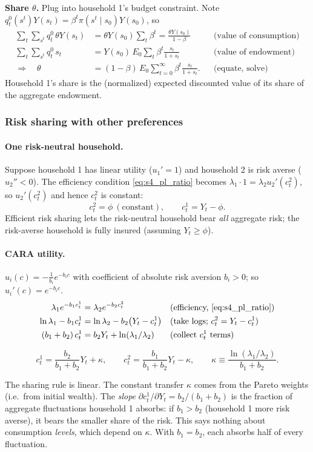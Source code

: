 \textbf{Share $\theta$.} Plug into household 1's budget constraint. Note $q^0_t(s^t)Y(s_t)=\beta^t\pi(s^t\mid s_0)Y(s_0)$, so
\begin{align*}
  \sum_t\sum_{s^t}q^0_t\,\theta Y(s_t) &= \theta Y(s_0)\sum_t\beta^t = \frac{\theta Y(s_0)}{1-\beta}
  && \text{(value of consumption)}\\
  \sum_t\sum_{s^t}q^0_t\, s_t &= Y(s_0)\,E_0\sum_t\beta^t\frac{s_t}{1+s_t}
  && \text{(value of endowment)}\\
  \Rightarrow\quad \theta &= (1-\beta)\,E_0\sum_{t=0}^\infty\beta^t\frac{s_t}{1+s_t}. && \text{(equate, solve)}
\end{align*}
Household 1's share is the (normalized) expected discounted value of its share of the aggregate endowment.

\subsubsection{Risk sharing with other preferences}
\paragraph{One risk-neutral household.} Suppose household 1 has linear utility ($u_1'=1$) and household 2 is risk averse ($u_2''<0$). The efficiency condition \eqref{eq:s4_pl_ratio} becomes $\lambda_1\cdot1=\lambda_2u_2'(c^2_t)$, so $u_2'(c^2_t)$ and hence $c^2_t$ is constant:
\[
  c^2_t=\phi\ (\text{constant}),\qquad c^1_t=Y_t-\phi .
\]
Efficient risk sharing lets the risk-neutral household bear \emph{all} aggregate risk; the risk-averse household is fully insured (assuming $Y_t\ge\phi$).

\paragraph{CARA utility.} $u_i(c)=-\frac{1}{b_i}e^{-b_ic}$ with coefficient of absolute risk aversion $b_i>0$; so $u_i'(c)=e^{-b_ic}$.
\begin{align*}
  \lambda_1e^{-b_1c^1_t}&=\lambda_2e^{-b_2c^2_t} && \text{(efficiency, \eqref{eq:s4_pl_ratio})}\\
  \ln\lambda_1-b_1c^1_t&=\ln\lambda_2-b_2\big(Y_t-c^1_t\big) && \text{(take logs; $c^2_t=Y_t-c^1_t$)}\\
  (b_1+b_2)\,c^1_t&=b_2Y_t+\ln(\lambda_1/\lambda_2) && \text{(collect $c^1_t$ terms)}
\end{align*}
\begin{keybox}[title=CARA risk sharing]
\[
  c^1_t = \frac{b_2}{b_1+b_2}Y_t + \kappa,\qquad
  c^2_t=\frac{b_1}{b_1+b_2}Y_t-\kappa,\qquad
  \kappa\equiv\frac{\ln(\lambda_1/\lambda_2)}{b_1+b_2}.
\]
\end{keybox}
The sharing rule is linear. The constant transfer $\kappa$ comes from the Pareto weights (i.e.\ from initial wealth). The \emph{slope} $\partial c^1_t/\partial Y_t=b_2/(b_1+b_2)$ is the fraction of aggregate fluctuations household 1 absorbs: if $b_1>b_2$ (household 1 more risk averse), it bears the smaller share of the risk. This says nothing about consumption \emph{levels}, which depend on $\kappa$. With $b_1=b_2$, each absorbs half of every fluctuation.

